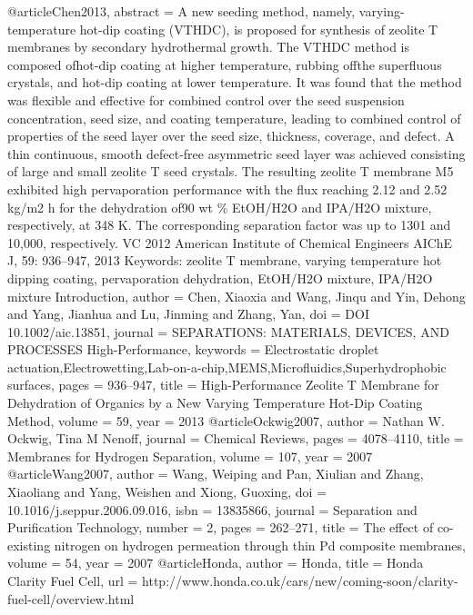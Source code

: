 @article{Chen2013,
abstract = {A new seeding method, namely, varying-temperature hot-dip coating (VTHDC), is proposed for synthesis of zeolite T membranes by secondary hydrothermal growth. The VTHDC method is composed ofhot-dip coating at higher temperature, rubbing offthe superfluous crystals, and hot-dip coating at lower temperature. It was found that the method was flexible and effective for combined control over the seed suspension concentration, seed size, and coating temperature, leading to combined control of properties of the seed layer over the seed size, thickness, coverage, and defect. A thin continuous, smooth defect-free asymmetric seed layer was achieved consisting of large and small zeolite T seed crystals. The resulting zeolite T membrane M5 exhibited high pervaporation performance with the flux reaching 2.12 and 2.52 kg/m2 h for the dehydration of90 wt {\%} EtOH/H2O and IPA/H2O mixture, respectively, at 348 K. The corresponding separation factor was up to 1301 and 10,000, respectively. VC 2012 American Institute of Chemical Engineers AIChE J, 59: 936–947, 2013 Keywords: zeolite T membrane, varying temperature hot dipping coating, pervaporation dehydration, EtOH/H2O mixture, IPA/H2O mixture Introduction},
author = {Chen, Xiaoxia and Wang, Jinqu and Yin, Dehong and Yang, Jianhua and Lu, Jinming and Zhang, Yan},
doi = {DOI 10.1002/aic.13851},
journal = {SEPARATIONS: MATERIALS, DEVICES, AND PROCESSES High-Performance},
keywords = {Electrostatic droplet actuation,Electrowetting,Lab-on-a-chip,MEMS,Microfluidics,Superhydrophobic surfaces},
pages = {936--947},
title = {{High-Performance Zeolite T Membrane for Dehydration of Organics by a New Varying Temperature Hot-Dip Coating Method}},
volume = {59},
year = {2013}
}
@article{Ockwig2007,
author = {{Nathan W. Ockwig}, Tina M Nenoff},
journal = {Chemical Reviews},
pages = {4078--4110},
title = {{Membranes for Hydrogen Separation}},
volume = {107},
year = {2007}
}
@article{Wang2007,
author = {Wang, Weiping and Pan, Xiulian and Zhang, Xiaoliang and Yang, Weishen and Xiong, Guoxing},
doi = {10.1016/j.seppur.2006.09.016},
isbn = {13835866},
journal = {Separation and Purification Technology},
number = {2},
pages = {262--271},
title = {{The effect of co-existing nitrogen on hydrogen permeation through thin Pd composite membranes}},
volume = {54},
year = {2007}
}
@article{Honda,
author = {Honda},
title = {{Honda Clarity Fuel Cell}},
url = {http://www.honda.co.uk/cars/new/coming-soon/clarity-fuel-cell/overview.html}
}
